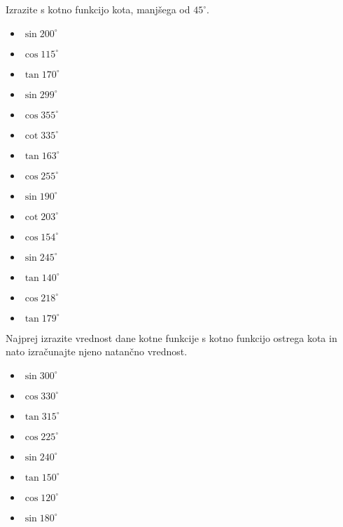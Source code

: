         
            \begin{naloga}
                Izrazite s kotno funkcijo kota, manjšega od $45^\circ$.
                \begin{itemize}
                    
                            \item $\sin{200^\circ} $ 
                            \item $\cos{115^\circ} $ 
                            \item $\tan{170^\circ} $ 
                            \item $\sin{299^\circ} $ 
                            \item $\cos{355^\circ} $ 
                            \item $\cot{335^\circ} $ 
                            \item $\tan{163^\circ} $ 
                            \item $\cos{255^\circ} $ 
                            \item $\sin{190^\circ} $ 
                            \item $\cot{203^\circ} $ 
                            \item $\cos{154^\circ} $ 
                            \item $\sin{245^\circ} $ 
                            \item $\tan{140^\circ} $ 
                            \item $\cos{218^\circ} $ 
                            \item $\tan{179^\circ} $ 
                    
                \end{itemize}
            \end{naloga}

        


        
            \begin{naloga}
                Najprej izrazite vrednost dane kotne funkcije s kotno funkcijo ostrega kota in nato izračunajte njeno natančno vrednost.
                \begin{itemize}
                    
                            \item $\sin{300^\circ} $ 
                            \item $\cos{330^\circ} $ 
                            \item $\tan{315^\circ} $ 
                            \item $\cos{225^\circ} $ 
                            \item $\sin{240^\circ} $ 
                            \item $\tan{150^\circ} $ 
                            \item $\cos{120^\circ} $ 
                            \item $\sin{180^\circ} $ 
                    
                \end{itemize}
            \end{naloga}

